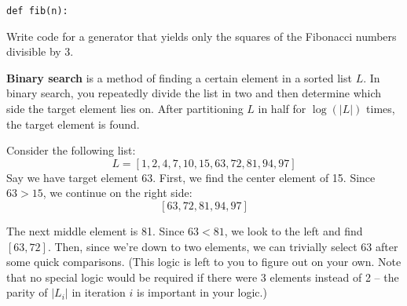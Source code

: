 \documentclass[addpoints]{exam}
\begin{document}
\begin{questions}
\begin{verbatim}
def fib(n):
\end{verbatim}


\question[15] Write code for a generator that yields only the squares of the Fibonacci numbers divisible by 3.


\newpage

\question \textbf{Binary search} is a method of finding a certain element in a sorted list $L$. In binary search, you repeatedly divide the list in two and then determine which side the target element lies on. After partitioning $L$ in half for $\log(|L|)$ times, the target element is found. 

Consider the following list: $$L = [1,2,4,7,10,15,63,72,81,94,97]$$ Say we have target element 63. First, we find the center element of 15. Since $63 > 15$, we continue on the right side: $$[63,72,81,94,97]$$

The next middle element is 81. Since $63 < 81$, we look to the left and find $[63,72]$. Then, since we're down to two elements, we can trivially select 63 after some quick comparisons. (This logic is left to you to figure out on your own. Note that no special logic would be required if there were 3 elements instead of 2 -- the parity of $|L_i|$ in iteration $i$ is important in your logic.)


\end{questions}
\end{document}
